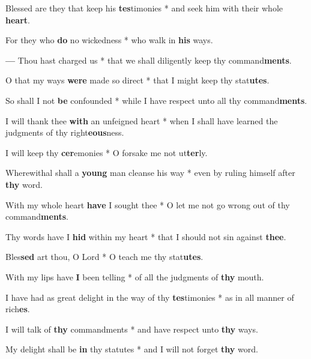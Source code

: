 \begin{multicols}{2}
	Blessed are they that keep his \textbf{tes}timonies * and seek him with their whole \textbf{heart}.
	
	For they who \textbf{do} no wickedness * who walk in \textbf{his} ways.
	
	\textbf{---} Thou hast charged us * that we shall diligently keep thy command\textbf{ments}.
	
	O that my ways \textbf{were} made so direct * that I might keep thy stat\textbf{utes}.
	
	So shall I not \textbf{be} confounded * while I have respect unto all thy command\textbf{ments}.
	
	I will thank thee \textbf{with} an unfeigned heart * when I shall have learned the judgments of thy right\textbf{eous}ness.
	
	I will keep thy \textbf{cer}emonies * O forsake me not ut\textbf{ter}ly.
	
	Wherewithal shall a \textbf{young} man cleanse his way * even by ruling himself after \textbf{thy} word.
	
	With my whole heart \textbf{have} I sought thee * O let me not go wrong out of thy command\textbf{ments}.
	
	Thy words have I \textbf{hid} within my heart * that I should not sin against \textbf{thee}.
	
	Bles\textbf{sed} art thou, O Lord * O teach me thy stat\textbf{utes}.
	
	With my lips have \textbf{I} been telling * of all the judgments of \textbf{thy} mouth.
	
	I have had as great delight in the way of thy \textbf{tes}timonies * as in all manner of rich\textbf{es}.
	
	I will talk of \textbf{thy} commandments * and have respect unto \textbf{thy} ways.
	
	My delight shall be \textbf{in} thy statutes * and I will not forget \textbf{thy} word.
\end{multicols}